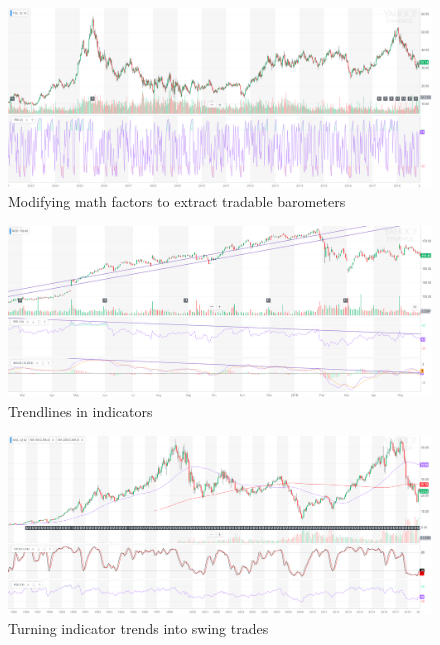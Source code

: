 \documentclass{article}
\begin{document}
\vspace{10pt}

\begin{figure}[!htb]
    \centering
    \includegraphics[width=\textwidth]{imgs/78.png}
    \caption{Modifying math factors to extract tradable barometers}
\end{figure}

\vspace{10pt}

\begin{figure}[!htb]
    \centering
    \includegraphics[width=\textwidth]{imgs/79.png}
    \caption{Trendlines in indicators}
\end{figure}

\vspace{10pt}

\begin{figure}[!htb]
    \centering
    \includegraphics[width=\textwidth]{imgs/80.png}
    \caption{Turning indicator trends into swing trades}
\end{figure}
\end{document}

